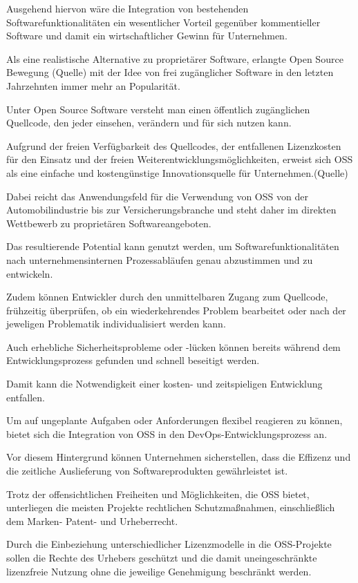 Ausgehend hiervon wäre die Integration von bestehenden Softwarefunktionalitäten ein wesentlicher Vorteil gegenüber kommentieller Software und damit ein wirtschaftlicher Gewinn für Unternehmen. 

Als eine realistische Alternative zu proprietärer Software, erlangte Open Source Bewegung (Quelle) mit der Idee von frei zugänglicher Software in den letzten Jahrzehnten immer mehr an Popularität.

Unter Open Source Software versteht man einen öffentlich zugänglichen Quellcode, den jeder einsehen, verändern und für sich nutzen kann.

Aufgrund der freien Verfügbarkeit des Quellcodes, der entfallenen Lizenzkosten für den Einsatz und der freien Weiterentwicklungsmöglichkeiten, erweist sich OSS als eine einfache und kostengünstige Innovationsquelle für Unternehmen.(Quelle)  

Dabei reicht das Anwendungsfeld für die Verwendung von OSS von der Automobilindustrie bis zur Versicherungsbranche und steht daher im direkten Wettbewerb zu proprietären Softwareangeboten. 

Das resultierende Potential kann genutzt werden, um Softwarefunktionalitäten nach unternehmensinternen Prozessabläufen genau abzustimmen und zu entwickeln.

Zudem können Entwickler durch den unmittelbaren Zugang zum Quellcode, frühzeitig überprüfen, ob ein wiederkehrendes Problem bearbeitet oder nach der jeweligen Problematik individualisiert werden kann.

Auch erhebliche Sicherheitsprobleme oder -lücken können  bereits während dem Entwicklungsprozess gefunden und schnell beseitigt werden.

Damit kann die Notwendigkeit einer kosten- und zeitspieligen Entwicklung entfallen. 

Um auf ungeplante Aufgaben oder Anforderungen flexibel reagieren zu können, bietet sich die Integration von OSS in den DevOps-Entwicklungsprozess an.    

Vor diesem Hintergrund können Unternehmen sicherstellen, dass die Effizenz und die zeitliche Auslieferung von Softwareprodukten gewährleistet ist. 

Trotz der offensichtlichen Freiheiten und Möglichkeiten, die OSS bietet, unterliegen die meisten Projekte rechtlichen Schutzmaßnahmen, einschließlich dem Marken- Patent- und Urheberrecht.

Durch die Einbeziehung unterschiedlicher Lizenzmodelle in die OSS-Projekte sollen die Rechte des Urhebers geschützt und die damit uneingeschränkte lizenzfreie Nutzung ohne die jeweilige Genehmigung beschränkt werden. 


